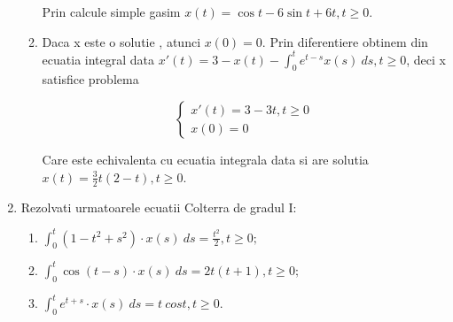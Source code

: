 \documentclass[a4paper,12pt,oneside]{report}
\begin{document}
\begin{enumerate}
\begin{enumerate}[label=(\alph*)]
		      		      Prin calcule simple gasim 
		      		      \(x\left ( t \right ) = \cos t - 6 \sin t  + 6t, t\geq 0.\)
		      		      		      		      		      		      		      		      		      		      
		      		\item Daca x este o solutie , atunci \(x\left ( 0 \right ) = 0\). Prin diferentiere obtinem din ecuatia integral data 
		      		      \({x}'\left ( t \right ) = 3 - x\left ( t \right ) - \int_{0}^{t}e^{t-s}x\left ( s \right )\ ds , t\geq 0\), 
		      		      deci x satisfice problema
		      		      		      		      		      		      		      		      		      		      
		      		      \begin{displaymath}
		      		      	\left\{\begin{matrix}
		      		      	{x}'\left ( t \right ) = 3 - 3t , t\geq 0\\ 
		      		      	x\left ( 0 \right ) = 0
		      		      	\end{matrix}\right.
		      		      \end{displaymath}
		      		      		      		      		      		      		      		      		      		      
		      		      Care este echivalenta cu ecuatia integrala data si are solutia 
		      		      \(x\left ( t \right ) = \frac{3}{2}t\left ( 2-t \right ), t\geq 0\).
		      		      		      		      		      		      		      		      		      		      
		      	\end{enumerate}
		      			      			      			      			      	        
		      	\item Rezolvati urmatoarele ecuatii Colterra de gradul I:
		      			      			      			      			      	
		      	\begin{enumerate}[label=(\alph*)]
		      		\item \(\int_{0}^{t}\left ( 1 - t^{2}  + s^{2}\right ) \cdot  x\left ( s \right ) \ ds  = \frac{t^{2}}{2}, t\geq 0;\)
		      		\item \(\int_{0}^{t}\cos \left ( t- s \right ) \cdot  x\left ( s \right ) \ ds  = 2t\left ( t+1 \right ), t\geq 0;\)
		      		\item \(\int_{0}^{t}e^{t+s} \cdot  x\left ( s \right ) \ ds  = t \ cos t , t\geq 0. \)
		      	\end{enumerate}
		      			      			      			      			      	

\end{enumerate}
\end{document}
